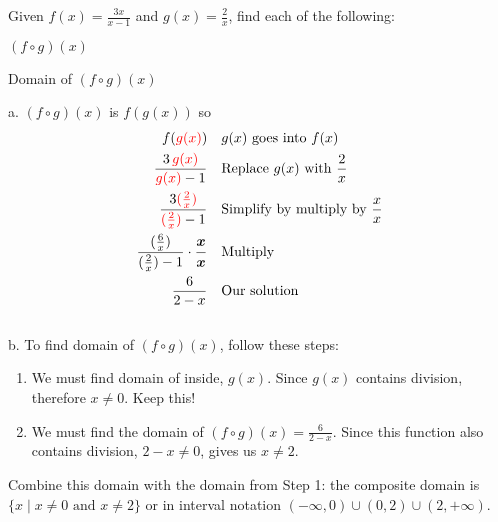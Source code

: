 %
\begin{exa}
    Given $f(x) = \frac{3x}{x-1}$ and $g(x) = \frac{2}{x}$, find each of the following:
    \begin{enumerate}[\bfseries a.]
    \begin{multicols}{2}
        \item $(f \circ g)(x)$
        \item Domain of $(f \circ g)(x)$
    \end{multicols}
    \end{enumerate}
\end{exa}
%
\vspace{0.2cm}
%
a. $(f \circ g)(x)$ is $f(g(x))$ so
\begin{align*}
    f(\textcolor{red}{g(x)})&    &   &\text{$g(x)$ goes into $f(x)$}\\
    \frac{3\,\textcolor{red}{g(x)}}{\textcolor{red}{g(x)}-1}& &   &\text{Replace $g(x)$ with $\frac{2}{x}$}\\
    \frac{3\textcolor{red}{(\frac{2}{x})}}{\textcolor{red}{(\frac{2}{x})}-1}&   &   &\text{Simplify by multiply by $\frac{x}{x}$}\\
    \frac{(\frac{6}{x})}{(\frac{2}{x})-1}\cdot \bm{\frac{x}{x}}&    &   &\text{Multiply}\\
    \frac{6}{2-x}&    &   &\text{Our solution}
\end{align*}
%
\\[0.2cm]
%
b. To find domain of $(f \circ g)(x)$, follow these steps:
\begin{enumerate}[1.]
    \item We must find domain of inside, $g(x)$. Since $g(x)$ contains division, therefore $x\ne 0$. Keep this!
    \item We must find the domain of $(f \circ g)(x) = \frac{6}{2-x}$. Since this function also contains division, $2-x\neq 0$, gives us $x\neq 2$.
\end{enumerate}
Combine this domain with the domain from Step 1: the composite domain is $\{x \mid x\neq 0 \text{ and } x\neq 2\}$ or in interval notation $(-\infty,0) \cup (0,2) \cup (2,+\infty)$.
